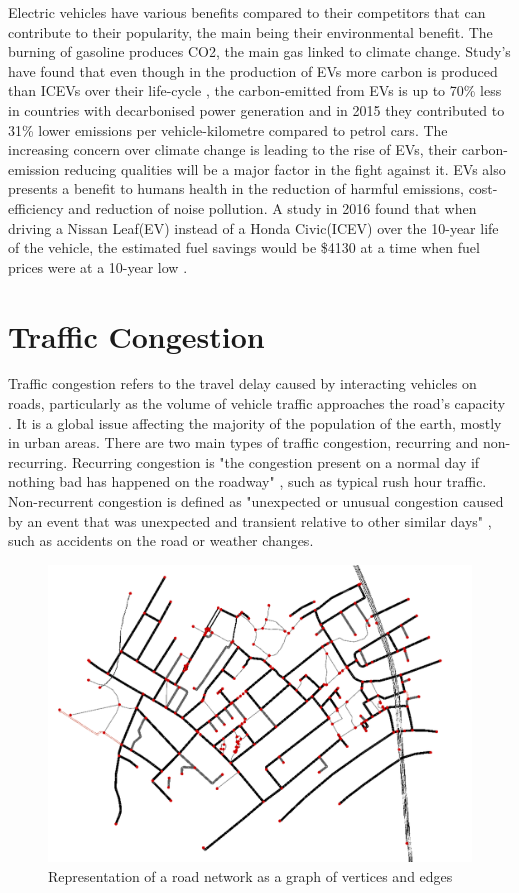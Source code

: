 \documentclass[11pt]{report}
\begin{document}
Electric vehicles have various benefits compared to their competitors that can contribute to their popularity, the main being their environmental benefit. The burning of gasoline produces CO2, the main gas linked to climate change. Study's have found that even though in the production of EVs more carbon is produced than ICEVs over their life-cycle \autocite{hampshire2018electric}, the carbon-emitted from EVs is up to 70\% less in countries with decarbonised power generation and in 2015 they contributed to 31\% lower emissions per vehicle-kilometre compared to petrol cars\autocite{knobloch2020net}. The increasing concern over climate change is leading to the rise of EVs, their carbon-emission reducing qualities will be a major factor in the fight against it. EVs also presents a benefit to humans health in the reduction of harmful emissions, cost-efficiency and reduction of noise pollution. A study in 2016 found that when driving a Nissan Leaf(EV) instead of a Honda Civic(ICEV) over the 10-year life of the vehicle, the estimated fuel savings would be \$4130 at a time when fuel prices were at a 10-year low \autocite{malmgren2016quantifying}.

\section{Traffic Congestion}

Traffic congestion refers to the travel delay caused by interacting vehicles on roads, particularly as the volume of vehicle traffic approaches the road's capacity \autocite{litman2016smart}. It is a global issue affecting the majority of the population of the earth, mostly in urban areas. There are two main types of traffic congestion, recurring and non-recurring. Recurring congestion is "the congestion present on a normal day if nothing bad has happened on the roadway" \autocite{hallenbeck2003measurement}, such as typical rush hour traffic. Non-recurrent congestion is defined as "unexpected or unusual congestion caused by an event that was unexpected and transient relative to other similar days" \autocite{hallenbeck2003measurement}, such as accidents on the road or weather changes.

\begin{figure}[h!]
  \centering
  \includegraphics[width=0.75\linewidth]{graphRoadNetwork.PNG}
  \caption{Representation of a road network as a graph of vertices and edges}
  \label{fig:2}
\end{figure}
\end{document}
